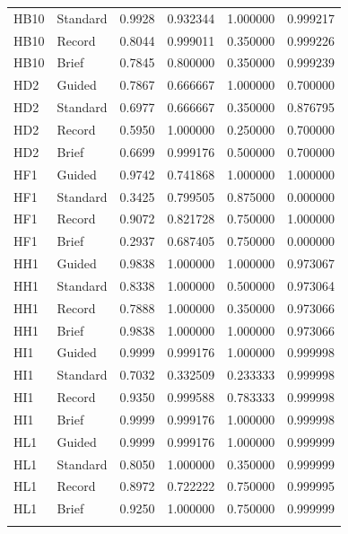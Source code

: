 \begin{longtable}{@{}llrrrr@{}}
HB10 & Standard & 0.9928 & 0.932344 & 1.000000 & 0.999217 \\
HB10 & Record & 0.8044 & 0.999011 & 0.350000 & 0.999226 \\
HB10 & Brief & 0.7845 & 0.800000 & 0.350000 & 0.999239 \\
\addlinespace[3pt]
HD2 & Guided & 0.7867 & 0.666667 & 1.000000 & 0.700000 \\
HD2 & Standard & 0.6977 & 0.666667 & 0.350000 & 0.876795 \\
HD2 & Record & 0.5950 & 1.000000 & 0.250000 & 0.700000 \\
HD2 & Brief & 0.6699 & 0.999176 & 0.500000 & 0.700000 \\
\addlinespace[3pt]
HF1 & Guided & 0.9742 & 0.741868 & 1.000000 & 1.000000 \\
HF1 & Standard & 0.3425 & 0.799505 & 0.875000 & 0.000000 \\
HF1 & Record & 0.9072 & 0.821728 & 0.750000 & 1.000000 \\
HF1 & Brief & 0.2937 & 0.687405 & 0.750000 & 0.000000 \\
\addlinespace[3pt]
HH1 & Guided & 0.9838 & 1.000000 & 1.000000 & 0.973067 \\
HH1 & Standard & 0.8338 & 1.000000 & 0.500000 & 0.973064 \\
HH1 & Record & 0.7888 & 1.000000 & 0.350000 & 0.973066 \\
HH1 & Brief & 0.9838 & 1.000000 & 1.000000 & 0.973066 \\
\addlinespace[3pt]
HI1 & Guided & 0.9999 & 0.999176 & 1.000000 & 0.999998 \\
HI1 & Standard & 0.7032 & 0.332509 & 0.233333 & 0.999998 \\
HI1 & Record & 0.9350 & 0.999588 & 0.783333 & 0.999998 \\
HI1 & Brief & 0.9999 & 0.999176 & 1.000000 & 0.999998 \\
\addlinespace[3pt]
HL1 & Guided & 0.9999 & 0.999176 & 1.000000 & 0.999999 \\
HL1 & Standard & 0.8050 & 1.000000 & 0.350000 & 0.999999 \\
HL1 & Record & 0.8972 & 0.722222 & 0.750000 & 0.999995 \\
HL1 & Brief & 0.9250 & 1.000000 & 0.750000 & 0.999999 \\
\addlinespace[3pt]
\end{longtable}
\endgroup
